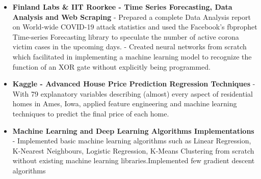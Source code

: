 \documentclass{article}
\begin{document}
\begin{itemize}
    \item{\textbf{\large{Finland Labs \& IIT Roorkee - Time Series Forecasting, Data Analysis and Web Scraping}}}
          \newline
          \textmd{- Prepared a complete Data Analysis report on World-wide COVID-19 attack statistics and used the Facebook's fbprophet Time-series Forecasting library to speculate the number of active corona victim cases in the upcoming days.}\newline
          \textmd{- Created neural networks from scratch which facilitated in implementing a machine learning model to recognize the function of an XOR gate without explicitly being programmed.}%

    \item{\textbf{\large{Kaggle - Advanced House Price Prediction Regression Techniques}}}
          \newline
          \textmd{-With 79 explanatory variables describing (almost) every aspect of residential homes in Ames, Iowa, applied feature engineering and machine learning techniques to predict the final price of each home.}
    \item{\textbf{\large{Machine Learning and Deep Learning Algorithms Implementations}}}
          \newline
          \textmd{- Implemented basic machine learning algorithms such as Linear Regression, K-Nearest Neighbours, Logistic Regression, K-Means Clustering from scratch without existing machine learning libraries.Implemented few gradient descent algorithms
          }
          \newline




\end{itemize}
\end{document}
